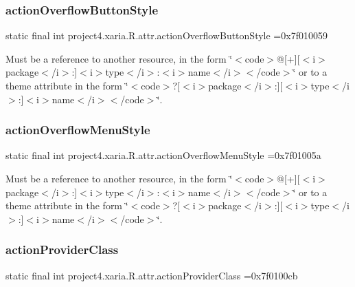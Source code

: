 \subsubsection{\texorpdfstring{action\+Overflow\+Button\+Style}{actionOverflowButtonStyle}}
{\footnotesize\ttfamily static final int project4.\+xaria.\+R.\+attr.\+action\+Overflow\+Button\+Style =0x7f010059\hspace{0.3cm}{\ttfamily [static]}}

Must be a reference to another resource, in the form \char`\"{}$<$code$>$@\mbox{[}+\mbox{]}\mbox{[}$<$i$>$package$<$/i$>$\+:\mbox{]}$<$i$>$type$<$/i$>$\+:$<$i$>$name$<$/i$>$$<$/code$>$\char`\"{} or to a theme attribute in the form \char`\"{}$<$code$>$?\mbox{[}$<$i$>$package$<$/i$>$\+:\mbox{]}\mbox{[}$<$i$>$type$<$/i$>$\+:\mbox{]}$<$i$>$name$<$/i$>$$<$/code$>$\char`\"{}. \mbox{\label{classproject4_1_1xaria_1_1R_1_1attr_a7e8ca524c0f8577cfa586268e267ac0d}} 
\subsubsection{\texorpdfstring{action\+Overflow\+Menu\+Style}{actionOverflowMenuStyle}}
{\footnotesize\ttfamily static final int project4.\+xaria.\+R.\+attr.\+action\+Overflow\+Menu\+Style =0x7f01005a\hspace{0.3cm}{\ttfamily [static]}}

Must be a reference to another resource, in the form \char`\"{}$<$code$>$@\mbox{[}+\mbox{]}\mbox{[}$<$i$>$package$<$/i$>$\+:\mbox{]}$<$i$>$type$<$/i$>$\+:$<$i$>$name$<$/i$>$$<$/code$>$\char`\"{} or to a theme attribute in the form \char`\"{}$<$code$>$?\mbox{[}$<$i$>$package$<$/i$>$\+:\mbox{]}\mbox{[}$<$i$>$type$<$/i$>$\+:\mbox{]}$<$i$>$name$<$/i$>$$<$/code$>$\char`\"{}. \mbox{\label{classproject4_1_1xaria_1_1R_1_1attr_a12eda25241e170bac64a48f4bf130453}} 
\subsubsection{\texorpdfstring{action\+Provider\+Class}{actionProviderClass}}
{\footnotesize\ttfamily static final int project4.\+xaria.\+R.\+attr.\+action\+Provider\+Class =0x7f0100cb\hspace{0.3cm}{\ttfamily [static]}}

